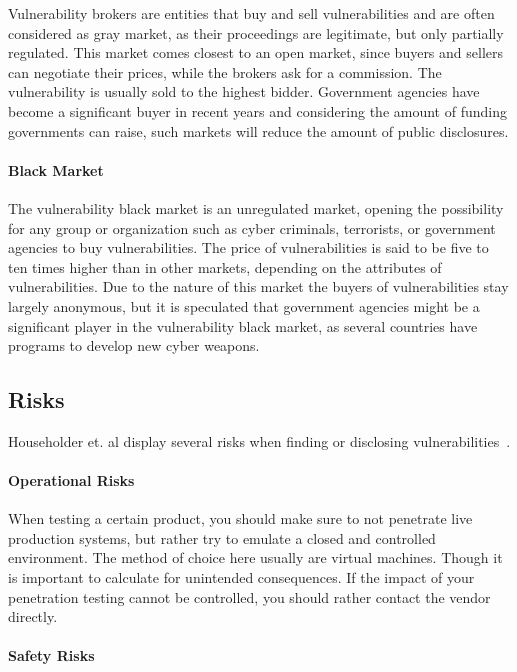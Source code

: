Vulnerability brokers are entities that buy and sell vulnerabilities and are 
often considered as gray market, as their proceedings are legitimate, but only
partially regulated. 
This market comes closest to an open market, since buyers and sellers can 
negotiate their prices, while the brokers ask for a commission.
The vulnerability is usually sold to the highest bidder.
Government agencies have become a significant buyer in recent years and 
considering the amount of funding governments can raise, such markets will
reduce the amount of public disclosures.

\paragraph{Black Market}

The vulnerability black market is an unregulated market, opening the possibility
for any group or organization such as cyber criminals, terrorists, or government
agencies to buy vulnerabilities.
The price of vulnerabilities is said to be five to ten times higher than in 
other markets, depending on the attributes of vulnerabilities.
Due to the nature of this market the buyers of vulnerabilities stay largely
anonymous, but it is speculated that government agencies might be a significant
player in the vulnerability black market, as several countries have programs
to develop new cyber weapons.

\subsection{Risks}

Householder et. al display several risks when finding or disclosing vulnerabilities~\cite{CertGuideCVD}.

\paragraph{Operational Risks}

When testing a certain product, you should make sure to not penetrate live production systems, but rather try to emulate a closed and controlled environment. The method of choice here usually are virtual machines. Though it is important to calculate for unintended consequences. If the impact of your penetration testing cannot be controlled, you should rather contact the vendor directly.

\paragraph{Safety Risks}

